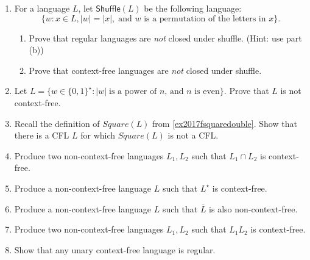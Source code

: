 \begin{enumerate}[resume]
\item {} For a language $L$, let $\textsf{Shuffle}(L)$ be the following language:
\[
\{ w : x \in L, |w| = |x|,\;\text{and $w$ is a permutation of the letters in $x$} \}.
\]
\begin{enumerate}
	\item Prove that regular languages are \emph{not} closed under shuffle. (Hint: use part (b))
	\item Prove that context-free languages are \emph{not} closed under shuffle.
\end{enumerate}

\item {} Let $L = \{w \in \{0, 1\}^\star : |w|\;\text{is a power of $n$, and $n$ is even}\}$. Prove that $L$ is not context-free.

\item {} Recall the definition of $Square(L)$ from \cref{ex2017fsquaredouble}. 
	Show that there is a CFL $L$ for which $Square(L)$ is not a CFL.

\item {} Produce two non-context-free languages $L_1, L_2$ such that $L_1 \cap L_2$ is context-free.

\item {} Produce a non-context-free language $L$ such that $L^\star$ is context-free.

\item {} Produce a non-context-free language $L$ such that $\overline{L}$ is also non-context-free.

\item {} Produce two non-context-free languages $L_1, L_2$ such that $L_1 L_2$ is context-free.

\item {} Show that any unary context-free language is regular.
\end{enumerate}

